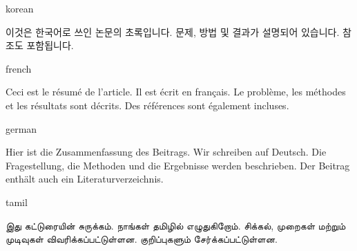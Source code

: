 \documentclass[colorlinks,nofoot,fontspec,spanish,japanese,russian,greek,ukrainian,vietnamese,french,portuguese,turkish,polish,indonesian,italian,german,latin,serbianc,bidi=basic]{asmeconf}
\begin{document}
\begin{selectlanguage}{korean}
\begin{abstract*}
이것은 한국어로 쓰인 논문의 초록입니다. 문제, 방법 및 결과가 설명되어 있습니다. 참조도 포함됩니다.
\end{abstract*}
\end{selectlanguage}%

{\NotoSerif
\begin{selectlanguage}{french}
\begin{abstract*}
Ceci est le résumé de l'article. Il est écrit en français. Le problème, les méthodes et les résultats sont décrits. Des références sont également incluses.
\end{abstract*}
\end{selectlanguage}%

\begin{selectlanguage}{german}
\begin{abstract*}
Hier ist die Zusammenfassung des Beitrags. Wir schreiben auf Deutsch. Die Fragestellung, die Methoden und die Ergebnisse werden beschrieben. Der Beitrag enthält auch ein Literaturverzeichnis.
\end{abstract*}
\end{selectlanguage}%
}%

\begin{selectlanguage}{tamil}
\begin{abstract*}
 இது கட்டுரையின் சுருக்கம். நாங்கள் தமிழில் எழுதுகிறோம். சிக்கல், முறைகள் மற்றும் முடிவுகள் விவரிக்கப்பட்டுள்ளன. குறிப்புகளும் சேர்க்கப்பட்டுள்ளன.
\end{abstract*}
\end{selectlanguage}%
\end{document}
